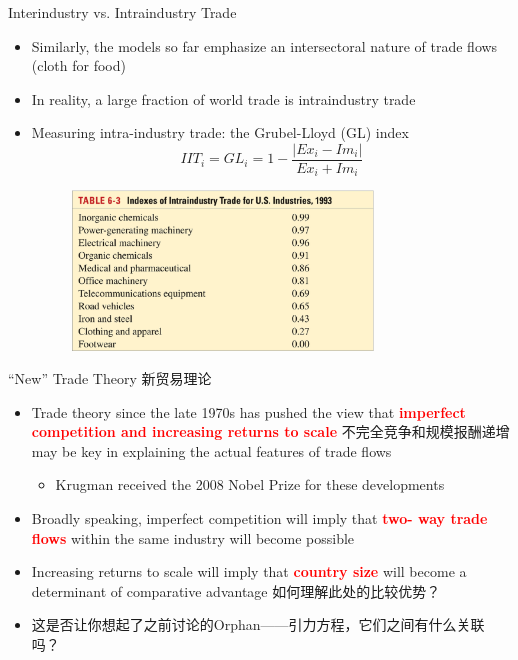 \documentclass[10pt,hyperref={CJKbookmarks=true},xcolor=dvipsnames,aspectratio=169]{beamer}
\begin{document}
\begin{frame}{Interindustry vs. Intraindustry Trade }

\begin{itemize}
\item Similarly, the models so far emphasize an intersectoral nature of
trade flows (cloth for food) 
\item In reality, a large fraction of world trade is intraindustry trade
\item Measuring intra-industry trade: the Grubel-Lloyd (GL) index 
\[
IIT_{i}=GL_{i}=1-\frac{|Ex_{i}-Im_{i}|}{Ex_{i}+Im_{i}}
\]
\begin{figure}
\centering{}\includegraphics[width=8cm]{fig/krugman/lec6-3}
\end{figure}

\end{itemize}
\end{frame}

\begin{frame}{“New” Trade Theory 新贸易理论 }

\begin{itemize}
\item Trade theory since the late 1970s has pushed the view that \textbf{\textcolor{red}{imperfect
competition and increasing returns to scale}} 不完全竞争和规模报酬递增 may be
key in explaining the actual features of trade flows 

\begin{itemize}
\item Krugman received the 2008 Nobel Prize for these developments
\end{itemize}
\item Broadly speaking, imperfect competition will imply that \textbf{\textcolor{red}{two-
way trade flows}} within the same industry will become possible 
\item Increasing returns to scale will imply that \textbf{\textcolor{red}{country
size}} will become a determinant of comparative advantage 如何理解此处的比较优势？
\item 这是否让你想起了之前讨论的Orphan——引力方程，它们之间有什么关联吗？
\end{itemize}
\end{frame}
\end{document}
